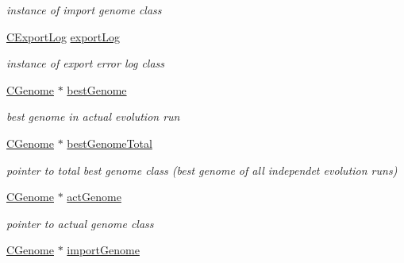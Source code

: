 \begin{DoxyCompactItemize}
\begin{DoxyCompactList}\small\item\em instance of import genome class \item\end{DoxyCompactList}\item 
\hypertarget{classCThreadCore_ac4d055b467336ef1f9195e44e3712bc3}{
\hyperlink{classCExportLog}{CExportLog} \hyperlink{classCThreadCore_ac4d055b467336ef1f9195e44e3712bc3}{exportLog}}
\label{classCThreadCore_ac4d055b467336ef1f9195e44e3712bc3}

\begin{DoxyCompactList}\small\item\em instance of export error log class \item\end{DoxyCompactList}\item 
\hypertarget{classCThreadCore_a8572b9b637d9202ccc81bbc0199091f7}{
\hyperlink{classCGenome}{CGenome} $\ast$ \hyperlink{classCThreadCore_a8572b9b637d9202ccc81bbc0199091f7}{bestGenome}}
\label{classCThreadCore_a8572b9b637d9202ccc81bbc0199091f7}

\begin{DoxyCompactList}\small\item\em best genome in actual evolution run \item\end{DoxyCompactList}\item 
\hypertarget{classCThreadCore_ae7f25c80e6a63af6cfe99cf835bda7dd}{
\hyperlink{classCGenome}{CGenome} $\ast$ \hyperlink{classCThreadCore_ae7f25c80e6a63af6cfe99cf835bda7dd}{bestGenomeTotal}}
\label{classCThreadCore_ae7f25c80e6a63af6cfe99cf835bda7dd}

\begin{DoxyCompactList}\small\item\em pointer to total best genome class (best genome of all independet evolution runs) \item\end{DoxyCompactList}\item 
\hypertarget{classCThreadCore_abc716aac8fde953bdffb62a2c0cd7406}{
\hyperlink{classCGenome}{CGenome} $\ast$ \hyperlink{classCThreadCore_abc716aac8fde953bdffb62a2c0cd7406}{actGenome}}
\label{classCThreadCore_abc716aac8fde953bdffb62a2c0cd7406}

\begin{DoxyCompactList}\small\item\em pointer to actual genome class \item\end{DoxyCompactList}\item 
\hypertarget{classCThreadCore_ab5bfacc207f66af97ba53cf31249b33b}{
\hyperlink{classCGenome}{CGenome} $\ast$ \hyperlink{classCThreadCore_ab5bfacc207f66af97ba53cf31249b33b}{importGenome}}
\label{classCThreadCore_ab5bfacc207f66af97ba53cf31249b33b}


\end{DoxyCompactItemize}
